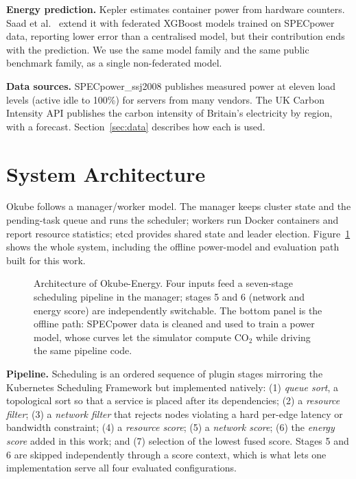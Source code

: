 \documentclass[conference]{IEEEtran}
\begin{document}
\textbf{Energy prediction.} Kepler \cite{amaral2023} estimates container power from hardware counters. Saad et al.\ \cite{saad2025} extend it with federated XGBoost models trained on SPECpower data, reporting lower error than a centralised model, but their contribution ends with the prediction. We use the same model family and the same public benchmark family, as a single non-federated model.

\textbf{Data sources.} SPECpower\_ssj2008 \cite{lange2009} publishes measured power at eleven load levels (active idle to 100\%) for servers from many vendors. The UK Carbon Intensity API \cite{carbonapi} publishes the carbon intensity of Britain's electricity by region, with a forecast. Section~\ref{sec:data} describes how each is used.

\section{System Architecture}
\label{sec:arch}
Okube follows a manager/worker model. The manager keeps cluster state and the pending-task queue and runs the scheduler; workers run Docker containers and report resource statistics; etcd provides shared state and leader election. Figure~\ref{fig:arch} shows the whole system, including the offline power-model and evaluation path built for this work.

\begin{figure}[t]
\centering
\resizebox{0.97\textwidth}{!}{}
\caption{Architecture of Okube-Energy. Four inputs feed a seven-stage scheduling pipeline in the manager; stages 5 and 6 (network and energy score) are independently switchable. The bottom panel is the offline path: SPECpower data is cleaned and used to train a power model, whose curves let the simulator compute CO$_2$ while driving the same pipeline code.}
\label{fig:arch}
\end{figure}

\textbf{Pipeline.} Scheduling is an ordered sequence of plugin stages mirroring the Kubernetes Scheduling Framework but implemented natively: (1) \emph{queue sort}, a topological sort so that a service is placed after its dependencies; (2) a \emph{resource filter}; (3) a \emph{network filter} that rejects nodes violating a hard per-edge latency or bandwidth constraint; (4) a \emph{resource score}; (5) a \emph{network score}; (6) the \emph{energy score} added in this work; and (7) selection of the lowest fused score. Stages 5 and 6 are skipped independently through a score context, which is what lets one implementation serve all four evaluated configurations.
\end{document}
